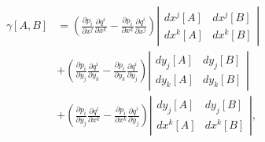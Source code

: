 \documentclass[a4paper,10pt]{article}
\numberwithin{equation}{section}
\begin{document}
\begin{align}
\begin{split}
 \gamma[A,B] &= \left(\frac{\partial p_i}{\partial x^j}\frac{\partial q^i}{\partial x^k} 
 - \frac{\partial p_i}{\partial x^k}\frac{\partial q^i}{\partial x^j}\right)\left|\begin{matrix}
                                                                             dx^j[A] & dx^j[B] \\
                                                                             dx^k[A] & dx^k[B]
                                                                            \end{matrix}\right| \\
 &+ \left(\frac{\partial p_i}{\partial y_j}\frac{\partial q^i}{\partial y_k} 
 - \frac{\partial p_i}{\partial y_k}\frac{\partial q^i}{\partial y_j}\right)\left|\begin{matrix}
                                                                             dy_j[A] & dy_j[B] \\
                                                                             dy_k[A] & dy_k[B]
                                                                            \end{matrix}\right| \\
 &+ \left(\frac{\partial p_i}{\partial y_j}\frac{\partial q^i}{\partial x^k} 
 - \frac{\partial p_i}{\partial x^k}\frac{\partial q^i}{\partial y_j}\right)\left|\begin{matrix}
                                                                             dy_j[A] & dy_j[B] \\
                                                                             dx^k[A] & dx^k[B]
                                                                            \end{matrix}\right|,
\end{split}
\end{align}
\end{document}

